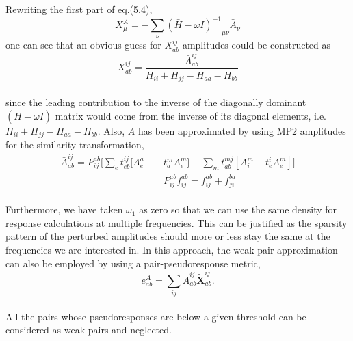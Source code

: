 Rewriting the first part of eq.(5.4),
\\
\begin{equation}
X_{\mu}^{A} = -\sum_{\nu}{{(\bar{H} - \omega I)}^{-1}}_{\mu\nu}\bar{A}_{\nu}
\end{equation}
one can see that an obvious guess for $X^{ij}_{ab}$ amplitudes could be constructed as
\\
\begin{equation}
X^{ij}_{ab} =  \frac{\bar{A}^{ij}_{ab}}{\bar{H}_{ii} + \bar{H}_{jj} - \bar{H}_{aa} - \bar{H}_{bb}} 
\end{equation} 
\\
since the leading contribution to the inverse of the diagonally dominant $(\bar{H} - \omega I)$ matrix 
would come from the inverse of its diagonal elements, i.e. $\bar{H}_{ii} + \bar{H}_{jj} - \bar{H}_{aa} - \bar{H}_{bb}$. 
Also, $\bar{A}$ has been approximated by using MP2 amplitudes for the similarity transformation,
\\
\begin{equation}
\begin{split}
\bar{A}^{ij}_{ab} = P_{ij}^{ab}\bigg[\sum_e t^{ij}_{eb}[A^a_e - & t^m_a A^m_e] -\sum_m t^{mj}_{ab}[A^m_i - t^i_e A^m_e]\bigg] \\
& P_{ij}^{ab} f_{ij}^{ab}  = f_{ij}^{ab} + f_{ji}^{ba}
\end{split}
\end{equation}
\\
Furthermore, we have taken $\omega_1$ as zero so that we can use the same density for response calculations at
multiple frequencies. This can be justified as the sparsity pattern of the perturbed amplitudes should more or less
stay the same at the frequencies we are interested in. In this approach, the weak pair approximation can also 
be employed by using a pair-pseudoresponse metric,
\\
\begin{equation}
e^{A}_{ab} =  \sum_{ij} \bar{A}^{ij}_{ab}\bm{\tilde{X}}^{ij}_{ab}.
\end{equation}
\\
All the pairs whose pseudoresponses are below a given threshold can be considered as weak pairs and neglected. 

